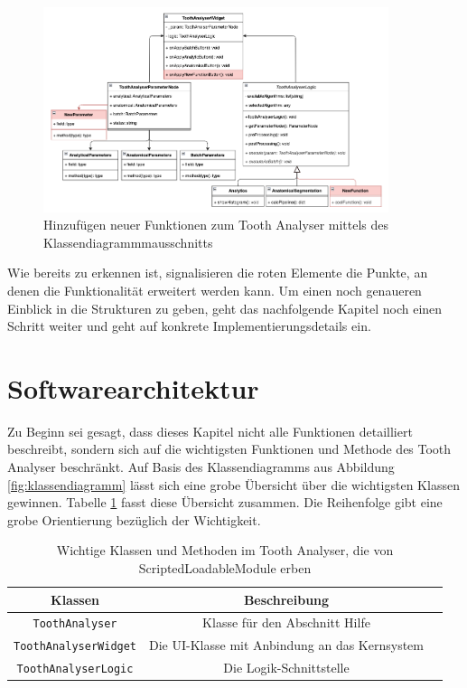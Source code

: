 \begin{figure}[h]
	\centering
	\includegraphics[width=0.9\textwidth]{
		img/tooth_analyser_class_diagram_new.png
	}
	\caption{Hinzufügen neuer Funktionen zum Tooth Analyser mittels des
	Klassendiagrammmausschnitts}
	\label{fig:klassendiagramm_new}
\end{figure}

Wie bereits zu erkennen ist, signalisieren die roten Elemente die Punkte, an denen
die Funktionalität erweitert werden kann. Um einen noch genaueren Einblick in
die Strukturen zu geben, geht das nachfolgende Kapitel noch einen Schritt weiter
und geht auf konkrete Implementierungsdetails ein.

\pagebreak

\section{Softwarearchitektur}
\label{sec:technische_umsetzung} Zu Beginn sei gesagt, dass dieses Kapitel nicht
alle Funktionen detailliert beschreibt, sondern sich auf die wichtigsten
Funktionen und Methode des Tooth Analyser beschränkt. Auf Basis des Klassendiagramms
aus Abbildung \ref{fig:klassendiagramm} lässt sich eine grobe Übersicht über die
wichtigsten Klassen gewinnen. Tabelle \ref{tab:methoden_klassen} fasst diese
Übersicht zusammen. Die Reihenfolge gibt eine grobe Orientierung bezüglich der Wichtigkeit.

\begin{table}[h]
	\centering
	\begin{tabular}{|c|c|c|}
		\hline
		\textbf{Klassen}             & \textbf{Beschreibung}                              \\
		\hline
		\texttt{ToothAnalyser}       & Klasse für den Abschnitt Hilfe                     \\
		\hline
		\texttt{ToothAnalyserWidget} & Die \ac{UI}-Klasse mit Anbindung an das Kernsystem \\
		\hline
		\texttt{ToothAnalyserLogic}  & Die Logik-Schnittstelle                            \\
		\hline
	\end{tabular}
	\caption{Wichtige Klassen und Methoden im Tooth Analyser, die von ScriptedLoadableModule
	erben}
	\label{tab:methoden_klassen}
\end{table}


